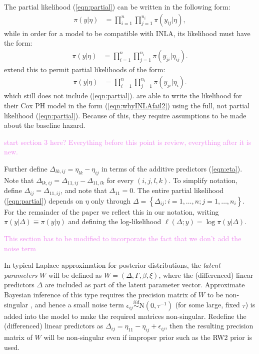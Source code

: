 \documentclass[ba]{imsart}
\newcommand{\alex}[1]{\textcolor{violet}{{ }#1}}
\begin{document}
The partial likelihood (\ref{eqn:partial}) can be written in the following form:
\begin{equation}\begin{aligned}\label{eqn:whyINLAfail1}
\pi(y|\eta) &= \prod_{i=1}^{n}\prod_{j=1}^{n_{i}} \pi(y_{ij}|\eta),
\end{aligned}\end{equation}
while in order for a model to be compatible with INLA, its likelihood must have the form:
\begin{equation}\begin{aligned}\label{eqn:whyINLAfail2}
\pi(y|\eta) &= \prod_{i=1}^{n}\prod_{j=1}^{n_{i}} \pi(y_{ji}|\eta_{ij}).
\end{aligned}\end{equation}
\cite{casecross} extend this to permit partial likelihoods of the form:
\begin{equation}\begin{aligned}\label{eqn:casecrosslik}
\pi(y|\eta) &= \prod_{i=1}^{n}\prod_{j=1}^{n_{i}} \pi(y_{ji}|\eta_{i}).
\end{aligned}\end{equation}
which still does not include (\ref{eqn:partial}). \cite{inlacoxph} are able to write the likelihood for their Cox PH model in the form (\ref{eqn:whyINLAfail2}) using the full, not partial likelihood (\ref{eqn:partial}). Because of this, they require assumptions to be made about the baseline hazard.

\alex{start section 3 here? Everything before this point is review, everything after it is new.}

Further define $\Delta_{lk,ij} = \eta_{lk} - \eta_{ij}$ in terms of the additive predictors (\ref{eqn:eta}). Note that $\Delta_{lk,ij} = \Delta_{11,ij} - \Delta_{11,lk}$ for every $(i,j,l,k)$. To simplify notation, define $\Delta_{ij} = \Delta_{11,ij}$, and note that $\Delta_{11} = 0$. The entire partial likelihood (\ref{eqn:partial}) depends on $\eta$ only through  $\Delta = \left\{\Delta_{ij}: i = 1,\ldots,n; j = 1,\ldots,n_{i} \right\}$. For the remainder of the paper we reflect this in our notation, writing $\pi(y|\Delta) \equiv \pi(y|\eta)$ and defining the log-likelihood $\ell(\Delta; y) = \log\pi(y|\Delta)$.

\alex{This section has to be modified to incorporate the fact that we don't add the noise term}

In typical Laplace approximation for posterior distributions, the \textit{latent parameters} $W$ will be defined as $W = \left(\Delta, \Gamma,\beta, \xi \right)$, where the (differenced) linear predictors $\Delta$ are included as part of the latent parameter vector. Approximate Bayesian inference of this type requires the precision matrix of $W$ to be non-singular \citep{inla,inlacoxph,casecross}, and hence a small noise term $\epsilon_{ij} \stackrel{iid}{\sim} \text{N}(0,\tau^{-1})$ (for some large, fixed $\tau$) is added into the model to make the required matrices non-singular. Redefine the (differenced) linear predictors as $\Delta_{ij} = \eta_{11} - \eta_{ij} + \epsilon_{ij}$, then the resulting precision matrix of $W$ will be non-singular even if improper prior such as the RW2 prior is used.
\end{document}

